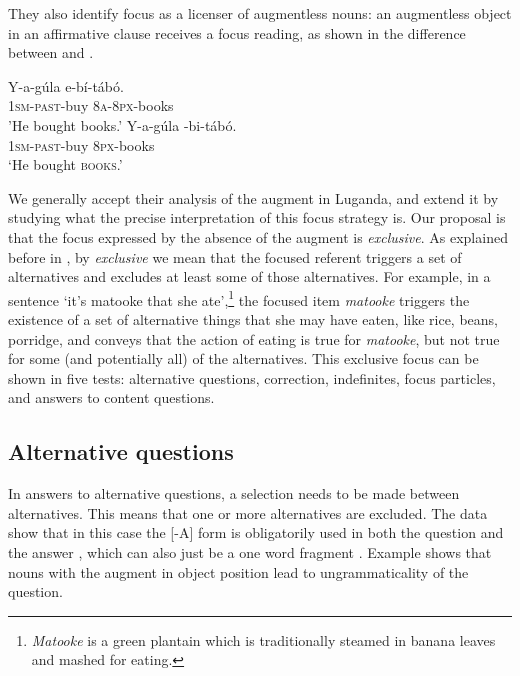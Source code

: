 \documentclass[output=paper]{langsci/langscibook}
\begin{document}
They also identify focus as a licenser of augmentless nouns: an augmentless object in an affirmative clause receives a focus reading, as shown in the difference between  and .

\ea\label{ex:vanderwal:25}
\ea\label{ex:vanderwal:25a}
\gll    Y-a-gúla    e-bí-tábó.\\
       \textsc{1sm}-\textsc{past}-buy  \textsc{8a}-\textsc{8px}-books\\
\glt   'He bought books.'
\ex\label{ex:vanderwal:25b}
\gll   Y-a-gúla    {\longrule}-bi-tábó.\\
       \textsc{1sm}-\textsc{past}-buy       \textsc{8px}-books\\
\glt   ‘He bought \textsc{books}.’ \citep[228]{HymanKatamba1993}
\z
\z

We generally accept their analysis of the augment in Luganda, and extend it by studying what the precise interpretation of this focus strategy is. Our proposal is that the focus expressed by the absence of the augment is \textit{exclusive}. As explained before in , by \textit{exclusive} we mean that the focused referent triggers a set of alternatives and excludes at least some of those alternatives. For example, in a sentence ‘it’s matooke that she ate’,\footnote{\textit{Matooke} is a green plantain which is traditionally steamed in banana leaves and mashed for eating. } {} the focused item \textit{matooke} triggers the existence of a set of alternative things that she may have eaten, like rice, beans, porridge, and conveys that the action of eating is true for \textit{matooke}, but not true for some (and potentially all) of the alternatives. This exclusive focus can be shown in five tests: alternative questions, correction, indefinites, focus particles, and answers to content questions.

\subsection{Alternative questions}\label{sec:vanderwal:4.1} %

In answers to alternative questions, a selection needs to be made between alternatives. This means that one or more alternatives are excluded. The data show that in this case the [-A] form is obligatorily used in both the question  and the answer , which can also just be a one word fragment . Example  shows that nouns with the augment in object position lead to ungrammaticality of the question. 
\end{document}
